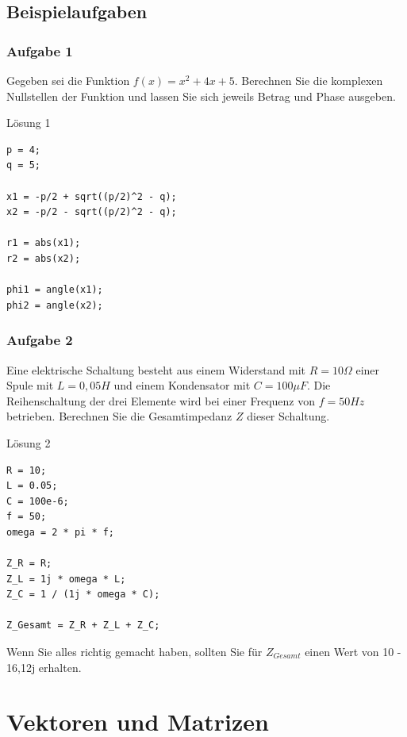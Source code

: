 \documentclass[12pt, a4paper, twoside]{article}
\begin{document}
        \subsection{Beispielaufgaben}
                \subsubsection*{Aufgabe 1}
                Gegeben sei die Funktion $f(x) = x^2 +4x +5$. Berechnen Sie die komplexen Nullstellen der Funktion und lassen Sie sich jeweils Betrag und Phase ausgeben.
                \begin{Codelösung}{Lösung 1}
                    \begin{lstlisting}
p = 4;
q = 5;

x1 = -p/2 + sqrt((p/2)^2 - q);
x2 = -p/2 - sqrt((p/2)^2 - q);

r1 = abs(x1);
r2 = abs(x2);

phi1 = angle(x1);
phi2 = angle(x2);
                    \end{lstlisting}
                    
                \end{Codelösung}


                \subsubsection*{Aufgabe 2}
                Eine elektrische Schaltung besteht aus einem Widerstand mit $R=10\Omega$ einer Spule mit $L=0,05H$ und einem Kondensator mit $C=100\mu F$. Die Reihenschaltung der drei Elemente wird bei einer Frequenz von $f=50Hz$ betrieben. Berechnen Sie die Gesamtimpedanz $Z$ dieser Schaltung.
                \begin{Codelösung}{Lösung 2}
                    \begin{lstlisting}
R = 10;
L = 0.05;
C = 100e-6;
f = 50;
omega = 2 * pi * f;

Z_R = R;
Z_L = 1j * omega * L;
Z_C = 1 / (1j * omega * C);

Z_Gesamt = Z_R + Z_L + Z_C;
                    \end{lstlisting}   
                \end{Codelösung}

                \noindent Wenn Sie alles richtig gemacht haben, sollten Sie für $Z_{Gesamt}$ einen Wert von 10 - 16,12j erhalten.
                
    \section{Vektoren und Matrizen}
\end{document}
